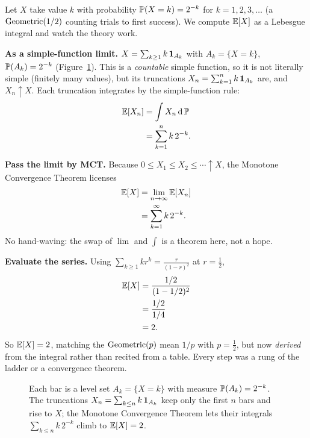 \begin{example}
\label{ch37:worked-geom}
Let $X$ take value $k$ with probability $\P(X=k)=2^{-k}$ for $k=1,2,3,\dots$
(a $\Geom(1/2)$ counting trials to first success). We compute $\E[X]$ as a
Lebesgue integral and watch the theory work.

\textbf{As a simple-function limit.} $X=\sum_{k\ge1} k\,\ind_{A_k}$ with
$A_k=\{X=k\}$, $\P(A_k)=2^{-k}$ (Figure~\ref{ch37:fig-geom-pmf}). This is a \emph{countable} simple function, so
it is not literally simple (finitely many values), but its truncations
$X_n=\sum_{k=1}^n k\,\ind_{A_k}$ are, and $X_n\uparrow X$. Each truncation
integrates by the simple-function rule:
\begin{align*}
  \E[X_n] &= \int X_n\,\dd\P \\
          &= \sum_{k=1}^n k\,2^{-k}.
\end{align*}

\textbf{Pass the limit by MCT.} Because $0\le X_1\le X_2\le\cdots\uparrow X$,
the Monotone Convergence Theorem licenses
\begin{align*}
  \E[X] &= \lim_{n\to\infty}\E[X_n] \\
        &= \sum_{k=1}^\infty k\,2^{-k}.
\end{align*}
No hand-waving: the swap of $\lim$ and $\int$ is a theorem here, not a hope.

\textbf{Evaluate the series.} Using $\sum_{k\ge1} k r^{k}=\frac{r}{(1-r)^2}$ at
$r=\tfrac12$,
\begin{align*}
  \E[X] &= \frac{1/2}{(1-1/2)^2} \\
        &= \frac{1/2}{1/4} \\
        &= 2.
\end{align*}
So $\E[X]=2$, matching the $\Geom(p)$ mean $1/p$ with $p=\tfrac12$, but now
\emph{derived} from the integral rather than recited from a table. Every step
was a rung of the ladder or a convergence theorem.
\end{example}

\begin{figure}[H]
\centering
{}
\caption{Each bar is a level set $A_k=\{X=k\}$ with measure $\P(A_k)=2^{-k}$.
The truncations $X_n=\sum_{k\le n}k\,\ind_{A_k}$ keep only the first $n$ bars and
rise to $X$; the Monotone Convergence Theorem lets their integrals
$\sum_{k\le n}k\,2^{-k}$ climb to $\E[X]=2$.}
\label{ch37:fig-geom-pmf}
\end{figure}

